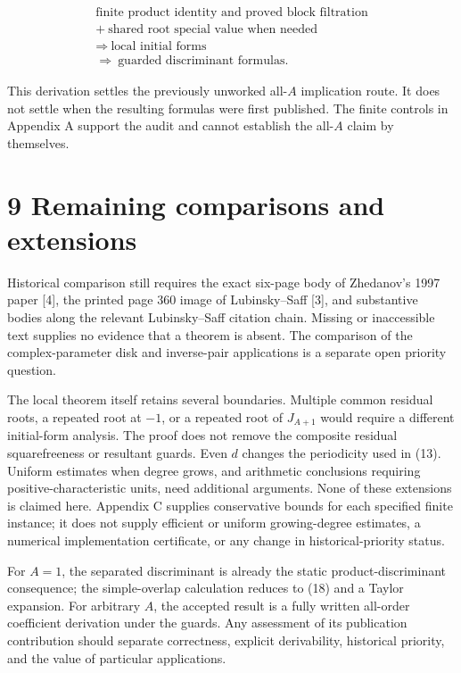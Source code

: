 \documentclass[
  11pt,
]{article}
\begin{document}
\[
\begin{gathered}
\text{finite product identity and proved block filtration}\\
+\ \text{shared root special value when needed}\\
\Longrightarrow\ \text{local initial forms}\\
\Longrightarrow\ \text{guarded discriminant formulas}.
\end{gathered}
\]

This derivation settles the previously unworked all-\(A\) implication
route. It does not settle when the resulting formulas were first
published. The finite controls in Appendix A support the audit and
cannot establish the all-\(A\) claim by themselves.

\section{9 Remaining comparisons and
extensions}\label{remaining-comparisons-and-extensions}

Historical comparison still requires the exact six-page body of
Zhedanov's 1997 paper {[}4{]}, the printed page 360 image of
Lubinsky--Saff {[}3{]}, and substantive bodies along the relevant
Lubinsky--Saff citation chain. Missing or inaccessible text supplies no
evidence that a theorem is absent. The comparison of the
complex-parameter disk and inverse-pair applications is a separate open
priority question.

The local theorem itself retains several boundaries. Multiple common
residual roots, a repeated root at \(-1\), or a repeated root of
\(J_{A+1}\) would require a different initial-form analysis. The proof
does not remove the composite residual squarefreeness or resultant
guards. Even \(d\) changes the periodicity used in (13). Uniform
estimates when degree grows, and arithmetic conclusions requiring
positive-characteristic units, need additional arguments. None of these
extensions is claimed here. Appendix C supplies conservative bounds for
each specified finite instance; it does not supply efficient or uniform
growing-degree estimates, a numerical implementation certificate, or
any change in historical-priority status.

For \(A=1\), the separated discriminant is already the static
product-discriminant consequence; the simple-overlap calculation reduces
to (18) and a Taylor expansion. For arbitrary \(A\), the accepted result
is a fully written all-order coefficient derivation under the guards.
Any assessment of its publication contribution should separate
correctness, explicit derivability, historical priority, and the value
of particular applications.
\end{document}
